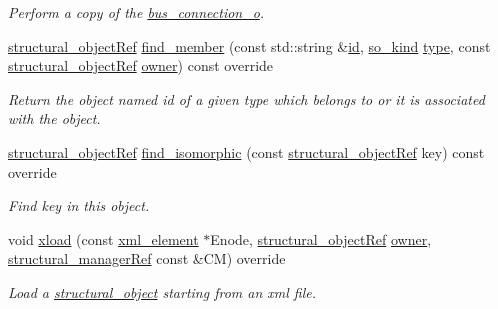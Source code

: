 \begin{DoxyCompactItemize}
\begin{DoxyCompactList}\small\item\em Perform a copy of the \hyperlink{classbus__connection__o}{bus\+\_\+connection\+\_\+o}. \end{DoxyCompactList}\item 
\hyperlink{structural__objects_8hpp_a8ea5f8cc50ab8f4c31e2751074ff60b2}{structural\+\_\+object\+Ref} \hyperlink{classbus__connection__o_a9196caaddc7a50e6ea504acf10ff7942}{find\+\_\+member} (const std\+::string \&\hyperlink{classstructural__object_a841a75f6e349ff7c1987dc92d4ac33a6}{id}, \hyperlink{structural__objects_8hpp_acf52399aecacb7952e414c5746ce6439}{so\+\_\+kind} \hyperlink{classstructural__object_a9a7159ce4c8da9984f256d9032f49778}{type}, const \hyperlink{structural__objects_8hpp_a8ea5f8cc50ab8f4c31e2751074ff60b2}{structural\+\_\+object\+Ref} \hyperlink{classstructural__object_a3e96b3e00b8a78adfc44872d82e186ea}{owner}) const override
\begin{DoxyCompactList}\small\item\em Return the object named id of a given type which belongs to or it is associated with the object. \end{DoxyCompactList}\item 
\hyperlink{structural__objects_8hpp_a8ea5f8cc50ab8f4c31e2751074ff60b2}{structural\+\_\+object\+Ref} \hyperlink{classbus__connection__o_a13ea12ac5af275b177d449ef3a7c5546}{find\+\_\+isomorphic} (const \hyperlink{structural__objects_8hpp_a8ea5f8cc50ab8f4c31e2751074ff60b2}{structural\+\_\+object\+Ref} key) const override
\begin{DoxyCompactList}\small\item\em Find key in this object. \end{DoxyCompactList}\item 
void \hyperlink{classbus__connection__o_a91d71ecab1533963248f3c50d86c9d0f}{xload} (const \hyperlink{classxml__element}{xml\+\_\+element} $\ast$Enode, \hyperlink{structural__objects_8hpp_a8ea5f8cc50ab8f4c31e2751074ff60b2}{structural\+\_\+object\+Ref} \hyperlink{classstructural__object_a3e96b3e00b8a78adfc44872d82e186ea}{owner}, \hyperlink{structural__manager_8hpp_ab3136f0e785d8535f8d252a7b53db5b5}{structural\+\_\+manager\+Ref} const \&CM) override
\begin{DoxyCompactList}\small\item\em Load a \hyperlink{classstructural__object}{structural\+\_\+object} starting from an xml file. \end{DoxyCompactList}\item 

\end{DoxyCompactItemize}
